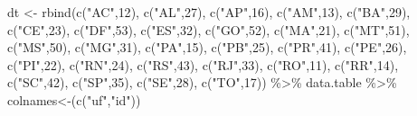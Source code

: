 \documentclass[
]{article}
\newenvironment{Shaded}{\begin{snugshade}}{\end{snugshade}}
\newcommand{\AttributeTok}[1]{\textcolor[rgb]{0.77,0.63,0.00}{#1}}
\newcommand{\DecValTok}[1]{\textcolor[rgb]{0.00,0.00,0.81}{#1}}
\newcommand{\FunctionTok}[1]{\textcolor[rgb]{0.00,0.00,0.00}{#1}}
\newcommand{\NormalTok}[1]{#1}
\newcommand{\OtherTok}[1]{\textcolor[rgb]{0.56,0.35,0.01}{#1}}
\newcommand{\SpecialCharTok}[1]{\textcolor[rgb]{0.00,0.00,0.00}{#1}}
\newcommand{\StringTok}[1]{\textcolor[rgb]{0.31,0.60,0.02}{#1}}
\begin{document}
\begin{Shaded}
\begin{Highlighting}[]
\NormalTok{dt }\OtherTok{\textless{}{-}} \FunctionTok{rbind}\NormalTok{(}\FunctionTok{c}\NormalTok{(}\StringTok{"AC"}\NormalTok{,}\DecValTok{12}\NormalTok{), }\FunctionTok{c}\NormalTok{(}\StringTok{"AL"}\NormalTok{,}\DecValTok{27}\NormalTok{), }\FunctionTok{c}\NormalTok{(}\StringTok{"AP"}\NormalTok{,}\DecValTok{16}\NormalTok{), }\FunctionTok{c}\NormalTok{(}\StringTok{"AM"}\NormalTok{,}\DecValTok{13}\NormalTok{), }\FunctionTok{c}\NormalTok{(}\StringTok{"BA"}\NormalTok{,}\DecValTok{29}\NormalTok{), }
              \FunctionTok{c}\NormalTok{(}\StringTok{"CE"}\NormalTok{,}\DecValTok{23}\NormalTok{), }\FunctionTok{c}\NormalTok{(}\StringTok{"DF"}\NormalTok{,}\DecValTok{53}\NormalTok{), }\FunctionTok{c}\NormalTok{(}\StringTok{"ES"}\NormalTok{,}\DecValTok{32}\NormalTok{), }\FunctionTok{c}\NormalTok{(}\StringTok{"GO"}\NormalTok{,}\DecValTok{52}\NormalTok{), }\FunctionTok{c}\NormalTok{(}\StringTok{"MA"}\NormalTok{,}\DecValTok{21}\NormalTok{), }
              \FunctionTok{c}\NormalTok{(}\StringTok{"MT"}\NormalTok{,}\DecValTok{51}\NormalTok{), }\FunctionTok{c}\NormalTok{(}\StringTok{"MS"}\NormalTok{,}\DecValTok{50}\NormalTok{), }\FunctionTok{c}\NormalTok{(}\StringTok{"MG"}\NormalTok{,}\DecValTok{31}\NormalTok{), }\FunctionTok{c}\NormalTok{(}\StringTok{"PA"}\NormalTok{,}\DecValTok{15}\NormalTok{), }\FunctionTok{c}\NormalTok{(}\StringTok{"PB"}\NormalTok{,}\DecValTok{25}\NormalTok{), }
              \FunctionTok{c}\NormalTok{(}\StringTok{"PR"}\NormalTok{,}\DecValTok{41}\NormalTok{), }\FunctionTok{c}\NormalTok{(}\StringTok{"PE"}\NormalTok{,}\DecValTok{26}\NormalTok{), }\FunctionTok{c}\NormalTok{(}\StringTok{"PI"}\NormalTok{,}\DecValTok{22}\NormalTok{), }\FunctionTok{c}\NormalTok{(}\StringTok{"RN"}\NormalTok{,}\DecValTok{24}\NormalTok{), }\FunctionTok{c}\NormalTok{(}\StringTok{"RS"}\NormalTok{,}\DecValTok{43}\NormalTok{), }
              \FunctionTok{c}\NormalTok{(}\StringTok{"RJ"}\NormalTok{,}\DecValTok{33}\NormalTok{), }\FunctionTok{c}\NormalTok{(}\StringTok{"RO"}\NormalTok{,}\DecValTok{11}\NormalTok{), }\FunctionTok{c}\NormalTok{(}\StringTok{"RR"}\NormalTok{,}\DecValTok{14}\NormalTok{), }\FunctionTok{c}\NormalTok{(}\StringTok{"SC"}\NormalTok{,}\DecValTok{42}\NormalTok{), }\FunctionTok{c}\NormalTok{(}\StringTok{"SP"}\NormalTok{,}\DecValTok{35}\NormalTok{), }
              \FunctionTok{c}\NormalTok{(}\StringTok{"SE"}\NormalTok{,}\DecValTok{28}\NormalTok{), }\FunctionTok{c}\NormalTok{(}\StringTok{"TO"}\NormalTok{,}\DecValTok{17}\NormalTok{)) }\SpecialCharTok{\%\textgreater{}\%}\NormalTok{ data.table }\SpecialCharTok{\%\textgreater{}\%} \StringTok{\textasciigrave{}}\AttributeTok{colnames\textless{}{-}}\StringTok{\textasciigrave{}}\NormalTok{(}\FunctionTok{c}\NormalTok{(}\StringTok{"uf"}\NormalTok{,}\StringTok{"id"}\NormalTok{))}
              

\end{Highlighting}
\end{Shaded}
\end{document}
